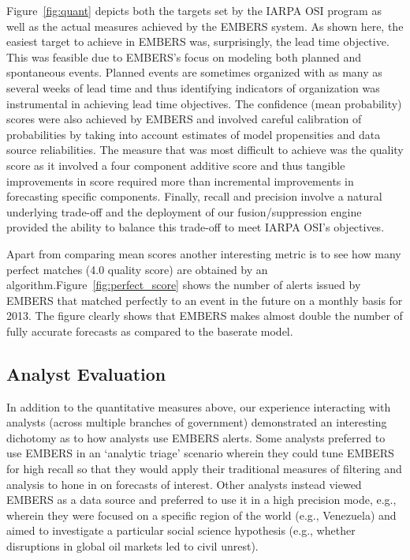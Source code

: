 Figure~\ref{fig:quant} depicts both the targets set by the IARPA OSI program as well as the
actual measures achieved by the EMBERS system. As shown here, the easiest target to achieve
in EMBERS was, surprisingly, the lead time objective. This was feasible due to EMBERS's focus on modeling
both planned and spontaneous events. Planned events are sometimes organized with as many as several weeks
of lead time and thus identifying indicators of organization was instrumental in achieving
lead time objectives. The confidence (mean probability) scores were also achieved by EMBERS and involved
careful calibration of probabilities by taking into account estimates of
model propensities and data source reliabilities. The measure that was most difficult to achieve
was the quality score as it involved a four component additive score and thus tangible improvements in
score required more than incremental improvements in forecasting specific components. Finally, recall
and precision involve a natural underlying trade-off and the deployment of our fusion/suppression
engine provided the ability to balance this trade-off to meet IARPA OSI's objectives.

Apart from comparing mean scores another interesting metric is to see
how many perfect matches (4.0 quality score) are obtained by an
algorithm.Figure~\ref{fig:perfect_score} shows the number of alerts issued
by EMBERS that matched perfectly to an event in the future on a monthly
basis for 2013.  The figure clearly shows that EMBERS makes almost double
the number of fully accurate forecasts as compared to the baserate
model.


\subsection{Analyst Evaluation}
In addition to the quantitative measures above, our experience interacting with analysts (across multiple
branches of government) demonstrated
an interesting dichotomy as to how analysts use EMBERS alerts. Some analysts preferred to use EMBERS in an
`analytic triage' scenario wherein they could tune EMBERS for high recall so that they would apply their
traditional measures of filtering and analysis to hone in on forecasts of interest. Other analysts
instead viewed EMBERS as a data source and preferred to use it in a high precision mode, e.g., wherein they
were focused on a specific region of the world (e.g., Venezuela) and aimed to investigate a particular
social science hypothesis (e.g., whether disruptions in global oil markets led to civil unrest).

